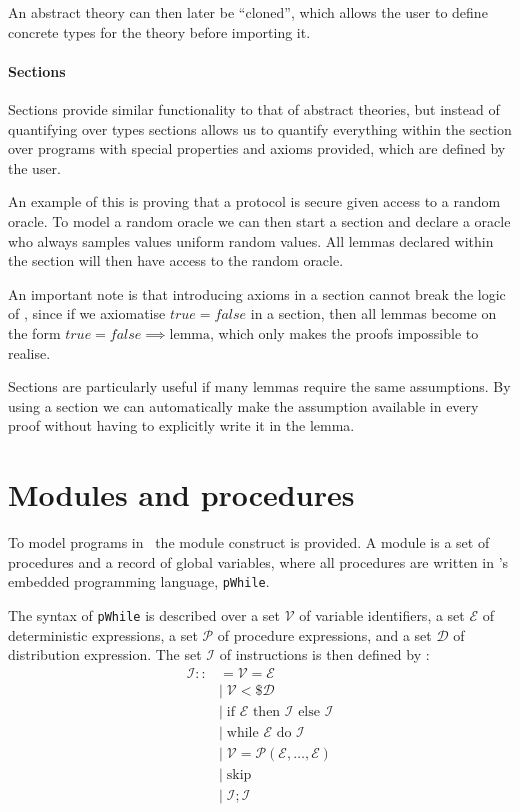 An abstract theory can then later be ``cloned'', which allows the user to define
concrete types for the theory before importing it.

\paragraph{Sections}
Sections provide similar functionality to that of abstract theories, but instead of quantifying over
types sections allows us to quantify everything within the section over programs
with special properties and axioms provided, which are defined by the user.

An example of this is proving that a protocol is secure given access to a
random oracle.
To model a random oracle we can then start a section and declare a oracle who
always samples values uniform random values.
All lemmas declared within the section will then have access to the random
oracle.

An important note is that introducing axioms in a section cannot break the logic
of \easycrypt, since if we axiomatise $true = false$ in a section, then all
lemmas become on the form $true = false \implies \text{lemma}$, which only
makes the proofs impossible to realise.

Sections are particularly useful if many lemmas require the same assumptions. By
using a section we can automatically make the assumption available in every
proof without having to explicitly write it in the lemma.

\section{Modules and procedures}
\label{sec:ec_modules}
To model programs in \easycrypt\ the module construct is provided.
A module is a set of procedures and a record of global variables, where all
procedures are written in \easycrypt's embedded programming language, \texttt{pWhile}.

The syntax of \texttt{pWhile} is described over a set $\mathcal{V}$ of variable
identifiers, a set $\mathcal{E}$ of deterministic expressions, a set
$\mathcal{P}$ of procedure expressions, and a set $\mathcal{D}$ of distribution
expression.
The set $\mathcal{I}$ of instructions is then defined
by \cite{zkcrypt}:
\begin{align*}
  \mathcal{I} ::&= \mathcal{V} = \mathcal{E} \\
              &|\; \mathcal{V} <\$ \mathcal{D} \\
              &|\; \text{if } \mathcal{E} \text{ then } \mathcal{I} \text{ else } \mathcal{I} \\
              &|\; \text{while } \mathcal{E} \text{ do } \mathcal{I} \\
              &|\; \mathcal{V} = \mathcal{P}(\mathcal{E}, \dots, \mathcal{E}) \\
              &|\; \text{skip} \\
              &|\; \mathcal{I}; \mathcal{I}
\end{align*}

